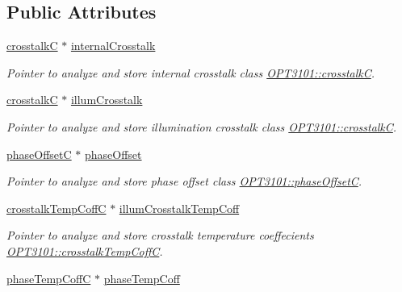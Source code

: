 \subsection*{Public Attributes}
\begin{DoxyCompactItemize}
\item 
\mbox{\hyperlink{class_o_p_t3101_1_1crosstalk_c}{crosstalkC}} $\ast$ \mbox{\hyperlink{class_o_p_t3101_1_1calibration_af63306e99b538aba754daa0d9f0c37a9}{internal\+Crosstalk}}
\begin{DoxyCompactList}\small\item\em Pointer to analyze and store internal crosstalk class \mbox{\hyperlink{class_o_p_t3101_1_1crosstalk_c}{O\+P\+T3101\+::crosstalkC}}. \end{DoxyCompactList}\item 
\mbox{\hyperlink{class_o_p_t3101_1_1crosstalk_c}{crosstalkC}} $\ast$ \mbox{\hyperlink{class_o_p_t3101_1_1calibration_a0aebed125263addca8bd8c809aad26f0}{illum\+Crosstalk}}
\begin{DoxyCompactList}\small\item\em Pointer to analyze and store illumination crosstalk class \mbox{\hyperlink{class_o_p_t3101_1_1crosstalk_c}{O\+P\+T3101\+::crosstalkC}}. \end{DoxyCompactList}\item 
\mbox{\hyperlink{class_o_p_t3101_1_1phase_offset_c}{phase\+OffsetC}} $\ast$ \mbox{\hyperlink{class_o_p_t3101_1_1calibration_abd318f8905f1e1834c3b21910a91c6a8}{phase\+Offset}}
\begin{DoxyCompactList}\small\item\em Pointer to analyze and store phase offset class \mbox{\hyperlink{class_o_p_t3101_1_1phase_offset_c}{O\+P\+T3101\+::phase\+OffsetC}}. \end{DoxyCompactList}\item 
\mbox{\hyperlink{class_o_p_t3101_1_1crosstalk_temp_coff_c}{crosstalk\+Temp\+CoffC}} $\ast$ \mbox{\hyperlink{class_o_p_t3101_1_1calibration_a5c5c221a8ff9285838315b9242d4d777}{illum\+Crosstalk\+Temp\+Coff}}
\begin{DoxyCompactList}\small\item\em Pointer to analyze and store crosstalk temperature coeffecients \mbox{\hyperlink{class_o_p_t3101_1_1crosstalk_temp_coff_c}{O\+P\+T3101\+::crosstalk\+Temp\+CoffC}}. \end{DoxyCompactList}\item 
\mbox{\hyperlink{class_o_p_t3101_1_1phase_temp_coff_c}{phase\+Temp\+CoffC}} $\ast$ \mbox{\hyperlink{class_o_p_t3101_1_1calibration_a15ab9d61ee871815d12cb52c8cd8be55}{phase\+Temp\+Coff}}

\end{DoxyCompactItemize}
